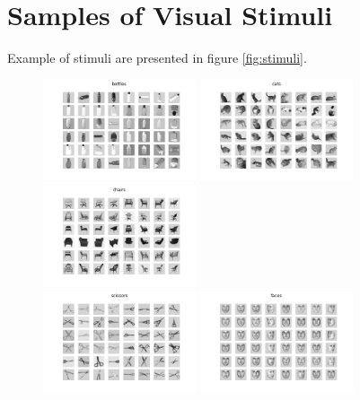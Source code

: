 \documentclass[10pt, twocolumn, letterpaper]{article}
\begin{document}


{\small


}

\appendix 
\section{Samples of Visual Stimuli}
\label{appendix:A}
Example of stimuli are presented in figure \ref{fig:stimuli}.

\begin{figure}
\centering
     \includegraphics[width=.33\linewidth, height=3cm,  valign=c]{images/bottles.png}
    \includegraphics[width=.33\linewidth, height=3cm,  valign=c]{images/cats.png}
    \includegraphics[width=.33\linewidth, height=3cm,  valign=c]{images/chairs.png}
    \\[\smallskipamount]
    \includegraphics[width=.33\linewidth, height=3cm,  valign=c]{images/scissors.png}
    \includegraphics[width=.33\linewidth, height=3cm,  valign=c]{images/faces.png}

\end{figure}
\end{document}

